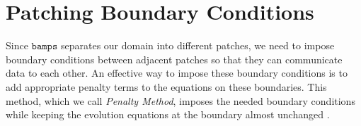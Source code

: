\section{Patching Boundary Conditions}
\label{section:Patch_Boundaries}

Since $\texttt{bamps}$ separates our domain into different patches, we need to impose boundary conditions between adjacent patches so that they can communicate data to each other. An effective way to impose these boundary conditions is to add appropriate penalty terms to the equations on these boundaries. This method, which we call \textit{Penalty Method}, imposes the needed boundary conditions while keeping the evolution equations at the boundary almost unchanged \cite{Pseudospectral_method_for_gravitational_wave_collapse,Spectral_methods_for_the_wave_equation_in_second-order_form}.

